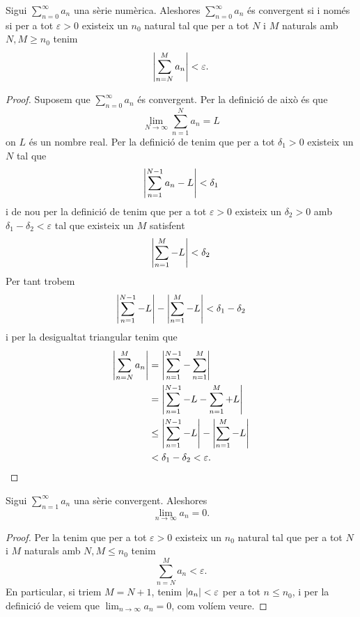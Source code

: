 \documentclass[../Apunts.tex]{subfiles}
\begin{document}
	\begin{theorem}
		\label{thm:condició de Cauchy}
		Sigui \(\sum_{n=0}^{\infty}a_{n}\) una sèrie numèrica. Aleshores \(\sum_{n=0}^{\infty}a_{n}\) és convergent si i només si per a tot \(\varepsilon>0\) existeix un \(n_{0}\) natural tal que per a tot \(N\) i \(M\) naturals amb \(N,M\geq n_{0}\) tenim
		\[\abs{\sum_{n=N}^{M}a_{n}}<\varepsilon.\]
		\begin{proof}
			Suposem que \(\sum_{n=0}^{\infty}a_{n}\) és convergent. Per la definició de  això és que
			\[\lim_{N\to\infty}\sum_{n=1}^{N}{a_{n}}=L\]
			on \(L\) és un nombre real. Per la definició de  tenim que per a tot \(\delta_{1}>0\) existeix un \(N\) tal que
			\[\abs{\sum_{n=1}^{N-1}{a_{n}}-L}<\delta_{1}\]
			i de nou per la definició de  tenim que per a tot \(\varepsilon>0\) existeix un \(\delta_{2}>0\) amb \(\delta_{1}-\delta_{2}<\varepsilon\) tal que existeix un \(M\) satisfent
			\[\abs{\sum_{n=1}^{M}-L}<\delta_{2}\]
			Per tant trobem
			\[\abs{\sum_{n=1}^{N-1}-L}-\abs{\sum_{n=1}^{M}-L}<\delta_{1}-\delta_{2}\]
			i per la desigualtat triangular %
			tenim que
			\begin{align*}
				\abs{\sum_{n=N}^{M}a_{n}}&=\abs{\sum_{n=1}^{N-1}-\sum_{n=1}^{M}}\\
				&=\abs{\sum_{n=1}^{N-1}-L-\sum_{n=1}^{M}+L}\\
				&\leq\abs{\sum_{n=1}^{N-1}-L}-\abs{\sum_{n=1}^{M}-L}\\
				&<\delta_{1}-\delta_{2}<\varepsilon.\qedhere
			\end{align*}
		\end{proof}
	\end{theorem}
	\begin{corollary}
		\label{cor:condició de Cauchy}\label{cor:terme general tendeix a zero en una sèrie convergent}
		Sigui \(\sum_{n=1}^{\infty}a_{n}\) una sèrie convergent. Aleshores
		\[\lim_{n\to\infty}a_{n}=0.\]
		\begin{proof}
			Per la  tenim que per a tot \(\varepsilon>0\) existeix un \(n_{0}\) natural tal que per a tot \(N\) i \(M\) naturals amb \(N,M\leq n_{0}\) tenim
			\[\sum_{n=N}^{M}a_{n}<\varepsilon.\]
			En particular, si triem \(M=N+1\), tenim \(\abs{a_{n}}<\varepsilon\) per a tot \(n\leq n_{0}\), i per la definició de  veiem que \(\lim_{n\to\infty}a_{n}=0\), com volíem veure.
		\end{proof}
	\end{corollary}
\end{document}
